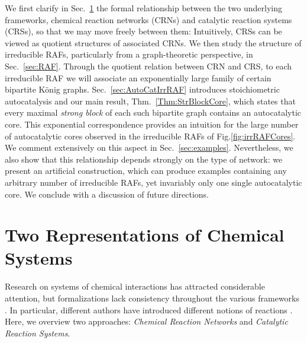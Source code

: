 \documentclass[pdflatex]{sn-jnl}
\theoremstyle{thmstyleone}%
\theoremstyle{examplesty}%
\theoremstyle{thmstylethree}%
\begin{document}
We first clarify in Sec.~\ref{sec:CRNCRS} the formal relationship between
the two underlying frameworks, chemical reaction networks (CRNs) and
catalytic reaction systems (CRSs), so that we may move freely between them:
Intuitively, CRSs can be viewed as quotient structures of associated
CRNs. We then study the structure of irreducible RAFs, particularly from a
graph-theoretic perspective, in Sec.~\ref{sec:RAF}. Through the quotient
relation between CRN and CRS, to each irreducible RAF we will associate an
exponentially large family of certain bipartite König
graphs. Sec.~\ref{sec:AutoCatIrrRAF} introduces stoichiometric
autocatalysis and our main result, Thm.~\ref{Thm:StrBlockCore}, which
states that every maximal \emph{strong block} \cite{grotschel_minimal_1979}
of each such bipartite graph contains an autocatalytic core. 
 This exponential correspondence provides an intuition for the large number of
autocatalytic cores observed in the irreducible RAFs of
Fig.\ref{fig:irrRAFCores}. We comment extensively on this aspect in
Sec.~\ref{sec:examples}. Nevertheless, we also show that this relationship
depends strongly on the type of network: we present an artificial
construction, which can produce examples containing any arbitrary number of
irreducible RAFs, yet invariably only one single autocatalytic core. We
conclude with a discussion of future directions.
 
\FloatBarrier

\section{Two Representations of Chemical Systems}\label{sec:CRNCRS}

Research on systems of chemical interactions has attracted considerable
attention, but formalizations lack consistency throughout the various
frameworks \cite{lohn_evolving_1998, steel_emergence_2000,
  feinberg_foundations_2019}. In particular, different authors have
introduced different notions of reactions \cite{muller_what_2022}. Here, we 
overview two approaches: \emph{Chemical Reaction Networks} and
\emph{Catalytic Reaction Systems}.
\end{document}
